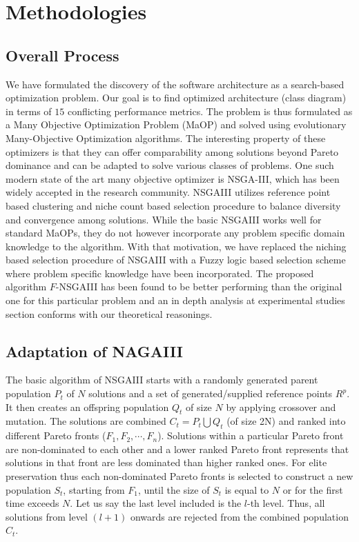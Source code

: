 \documentclass[letterpaper, 10 pt, conference]{ieeeconf}  %
\begin{document}
 


\section{Methodologies}
\label{sec:methodologies}

\subsection{Overall Process}
We have formulated the discovery of the software architecture as a search-based optimization problem. Our goal is to find optimized architecture (class diagram) in terms of $15$ conflicting performance metrics. The problem is thus formulated as a Many Objective Optimization Problem (MaOP) and solved using evolutionary Many-Objective Optimization algorithms. The interesting property of these optimizers is that they can offer comparability among solutions beyond Pareto dominance and can be adapted to solve various classes of problems. One such modern state of the art many objective optimizer is NSGA-III, which has been widely accepted in the research community. NSGAIII utilizes reference point based clustering and niche count based selection procedure to balance diversity and convergence among solutions. While the basic NSGAIII works well for standard MaOPs, they do not however incorporate any problem specific domain knowledge to the algorithm. With that motivation, we have replaced the niching based selection procedure of NSGAIII with a Fuzzy logic based selection scheme where problem specific knowledge have been incorporated. The proposed algorithm $F$-NSGAIII has been found to be better performing than the original one for this particular problem and an in depth analysis at experimental studies section conforms with our theoretical reasonings.



\subsection{Adaptation of NAGAIII}
\label{subsec:pseudocode}

The basic algorithm of NSGAIII starts with a randomly generated parent population $P_t$ of $N$ solutions and a set of generated/supplied reference points $R^p$. It then creates an offspring population $Q_t$ of size $N$ by applying crossover and mutation. The solutions are combined $C_t = P_t \bigcup Q_t$ (of size 2N) and ranked into different Pareto fronts ($F_1, F_2, \cdots, F_n$). Solutions within a particular Pareto front are non-dominated to each other and a lower ranked Pareto front represents that solutions in that front are less dominated than higher ranked ones. For elite preservation thus each non-dominated Pareto fronts is selected to construct a new population $S_t$, starting from $F_1$, until the size of $S_t$ is equal to $N$ or for the first time exceeds $N$. Let us say the last level included is the $l$-th level. Thus, all solutions from level $(l + 1)$ onwards are rejected from the combined population $C_t$. 
\end{document}
